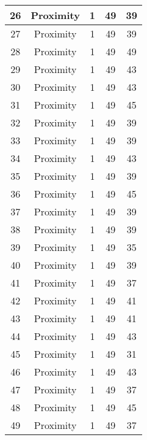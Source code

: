 \documentclass[results.tex]{subfiles}
\begin{document}
\begin{center}
\begin{tabular}{| c || c | c | c | c |}
    \hline
    26 & Proximity & 1 & 49 & 39 \\ 
    \hline
    27 & Proximity & 1 & 49 & 39 \\ 
    \hline
    28 & Proximity & 1 & 49 & 49 \\ 
    \hline
    29 & Proximity & 1 & 49 & 43 \\ 
    \hline
    30 & Proximity & 1 & 49 & 43 \\ 
    \hline
    31 & Proximity & 1 & 49 & 45 \\ 
    \hline
    32 & Proximity & 1 & 49 & 39 \\ 
    \hline
    33 & Proximity & 1 & 49 & 39 \\ 
    \hline
    34 & Proximity & 1 & 49 & 43 \\ 
    \hline
    35 & Proximity & 1 & 49 & 39 \\ 
    \hline
    36 & Proximity & 1 & 49 & 45 \\ 
    \hline
    37 & Proximity & 1 & 49 & 39 \\ 
    \hline
    38 & Proximity & 1 & 49 & 39 \\ 
    \hline
    39 & Proximity & 1 & 49 & 35 \\ 
    \hline
    40 & Proximity & 1 & 49 & 39 \\ 
    \hline
    41 & Proximity & 1 & 49 & 37 \\ 
    \hline
    42 & Proximity & 1 & 49 & 41 \\ 
    \hline
    43 & Proximity & 1 & 49 & 41 \\ 
    \hline
    44 & Proximity & 1 & 49 & 43 \\ 
    \hline
    45 & Proximity & 1 & 49 & 31 \\ 
    \hline
    46 & Proximity & 1 & 49 & 43 \\ 
    \hline
    47 & Proximity & 1 & 49 & 37 \\ 
    \hline
    48 & Proximity & 1 & 49 & 45 \\ 
    \hline
    49 & Proximity & 1 & 49 & 37 \\ 
    \hline   \end{tabular}
\end{center}
\end{document}
